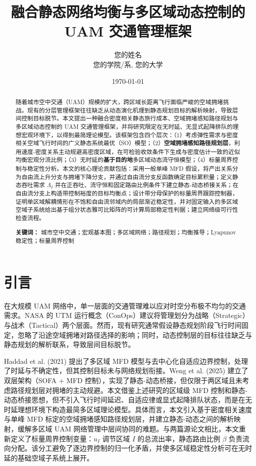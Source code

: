 \documentclass[a4paper,12pt]{article}
\title{\textbf{融合静态网络均衡与多区域动态控制的 UAM 交通管理框架}}
\author{您的姓名 \\ 您的学院/系, 您的大学}
\date{\today}
\theoremstyle{plain}
\theoremstyle{definition}
\theoremstyle{remark}
\begin{document}
\maketitle

\begin{abstract}
随着城市空中交通（UAM）规模的扩大，跨区域长距离飞行面临严峻的空域拥堵挑战。现有的分层管理框架往往缺乏从动态演化机理到静态规划目标的解析映射，导致层间控制目标脱节。本文提出一种融合密度相关静态旅行成本、空域拥堵感知路径规划与多区域动态控制的 UAM 交通管理框架，并将研究限定在无时延、无显式起降排队的理想宏观环境下，以得到最简理论模型。该框架包含四个层次：（1）考虑弹性需求与密度相关空域飞行时间的广义静态系统最优（SO）模型；（2）\textbf{空域拥堵感知路径规划层}，利用速度-密度关系主动规避高密度区域，在可检验收敛条件下生成与密度估计一致的近似均衡宏观分流比例；（3）无时延的\textbf{基于目的地}多区域动态流守恒模型；（4）标量周界控制与稳定性分析。本文的核心理论贡献包括：采用一般单峰 MFD 假设，将产出关系分为自由流上升分支与拥堵下降分支，并通过自由流分支反函数确定目标累积量；定义静态吞吐需求 $\Lambda_I$ 并在正吞吐、流守恒和固定路由比例条件下建立静态-动态桥接关系；在自由流分支上构造带控制裕度的目标均衡点；设计带分母保护的标量周界跟踪控制器，证明单区域解耦情形在不饱和自由流邻域内的局部渐近稳定性，并对固定输入的多区域空域子系统给出基于组分状态雅可比矩阵的可计算局部稳定性判据；建立网络级可行性检查流程。

\textbf{关键词：} 城市空中交通；宏观基本图；多区域网络；路径规划；均衡推导；Lyapunov 稳定性；标量周界控制
\end{abstract}

\section{引言}
在大规模 UAM 网络中，单一层面的交通管理难以应对时空分布极不均匀的交通需求。NASA 的 UTM 运行概念（ConOps）建议将管理划分为战略（Strategic）与战术（Tactical）两个层面。然而，现有研究通常假设静态规划阶段飞行时间固定，忽略了沿途空域拥堵对路径选择的影响；同时，动态控制层的目标往往缺乏与静态规划的解析联系，导致层间目标脱节。

Haddad et al. (2021) 提出了多区域 MFD 模型与去中心化自适应边界控制，处理了时延与不确定性，但其控制目标未与网络规划衔接。Weng et al. (2025) 建立了双层架构（SOFA + MFD 控制），实现了静态-动态桥接，但仅限于两区域且未考虑路径规划层对拥堵的主动规避。本文借鉴上述研究的区域级 MFD 控制和静态-动态桥接思想，但不引入飞行时间延迟、自适应律或显式起降排队状态，而是在无时延理想环境下构造最简多区域理论模型。具体而言，本文引入基于密度相关速度与单峰 MFD 标定的空域拥堵感知路径规划层，并建立静态-动态之间的解析映射，缓解多区域 UAM 网络管理中层间协同的难题。与两篇源论文相比，本文重新定义了标量周界控制变量：$u_I$ 调节区域 $I$ 的总流出率，静态路由比例 $\beta$ 负责流向分配。该分工避免了逐边界控制的归一化矛盾，并使多区域稳定性分析可在无时延的基础空域子系统上展开。
\end{document}
